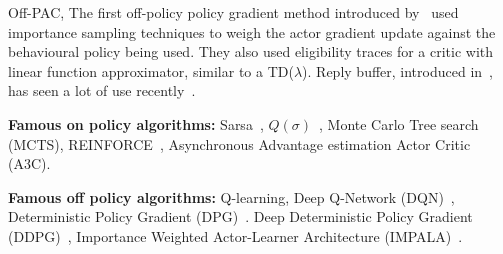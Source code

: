 \documentclass{../main.tex}{}
\begin{document}
Off-PAC, The first off-policy policy gradient method introduced by~\cite{Degris2012} used importance sampling techniques to weigh the actor gradient update against the behavioural policy being used. They also used eligibility traces for a critic with linear function approximator, similar to a TD($\lambda$). Reply buffer, introduced in~\cite{Lin1993}, has seen a lot of use recently~\citep{Mnih2013, Mnih2016}. %



\textbf{Famous on policy algorithms:} Sarsa~\citep{Sutton1998}, $Q(\sigma)$~\citep{Deasis2017}, Monte Carlo Tree search (MCTS), REINFORCE~\citep{Williams1992}, Asynchronous Advantage estimation Actor Critic (A3C).

\textbf{Famous off policy algorithms:} Q-learning, Deep Q-Network (DQN)~\citep{Mnih2013}, Deterministic Policy Gradient (DPG)~\citep{Silver2014}. Deep Deterministic Policy Gradient (DDPG)~\citep{Lillicrap2015}, Importance Weighted Actor-Learner Architecture (IMPALA)~\citep{Espeholt2018}.


% 
\end{document}
